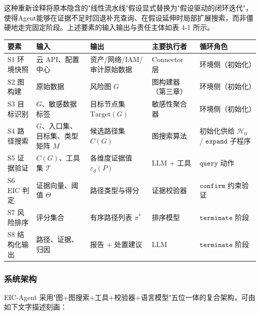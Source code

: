 \documentclass[a4paper,12pt]{ctexart}
\begin{document}
这种重新诠释将原本隐含的"线性流水线"假设显式替换为"假设驱动的闭环迭代"，使得Agent能够在证据不足时回退补充查询、在假设延伸时局部扩展搜索，而非僵硬地走完固定阶段。上述要素的输入输出与责任主体如表 4-1 所示。

\begin{table}[htbp]
\centering
\small
\setlength{\tabcolsep}{4pt}
\begin{tabular}{|l|l|l|l|l|}
\hline
\textbf{要素} & \textbf{输入} & \textbf{输出} & \textbf{主要执行者} & \textbf{循环角色} \\
\hline
S1 环境快照 & 云 API、配置中心 & 资产/网络/IAM/审计原始数据 & Connector 层 & 环境侧（初始化） \\
\hline
S2 图构建 & 原始数据 & 风险图 $G$ & 图构建器（第三章） & 环境侧（初始化） \\
\hline
S3 目标识别 & $G$、敏感数据标签 & 目标节点集 $\text{Target}(G)$ & 敏感性聚合器 & 环境侧（初始化） \\
\hline
S4 路径搜索 & $G$、入口集、目标集、类型矩阵 $M$ & 候选路径集 $C(G)$ & 图搜索算法 & 初始化供给 $\mathcal{H}_0$ / $\texttt{expand}$ 子程序 \\
\hline
S5 证据验证 & $C(G)$、工具集 $\mathcal{T}$ & 各维度证据值 $\varepsilon_d(P)$ & LLM + 工具 & $\texttt{query}$ 动作 \\
\hline
S6 EIC 判定 & 证据向量、阈值 $\Theta$ & 路径类型与得分 & 证据校验器 & $\texttt{confirm}$ 约束验证 \\
\hline
S7 风险排序 & 评分集合 & 有序路径列表 $\pi^*$ & 排序模型 & $\texttt{terminate}$ 阶段 \\
\hline
S8 结构化输出 & 路径、证据、归因 & 报告 + 处置建议 & LLM & $\texttt{terminate}$ 阶段 \\
\hline
\end{tabular}
\end{table}

\subsubsection{系统架构}

EIC-Agent 采用"图+图搜索+工具+校验器+语言模型"五位一体的复合架构，可由如下文字描述刻画：
\end{document}
